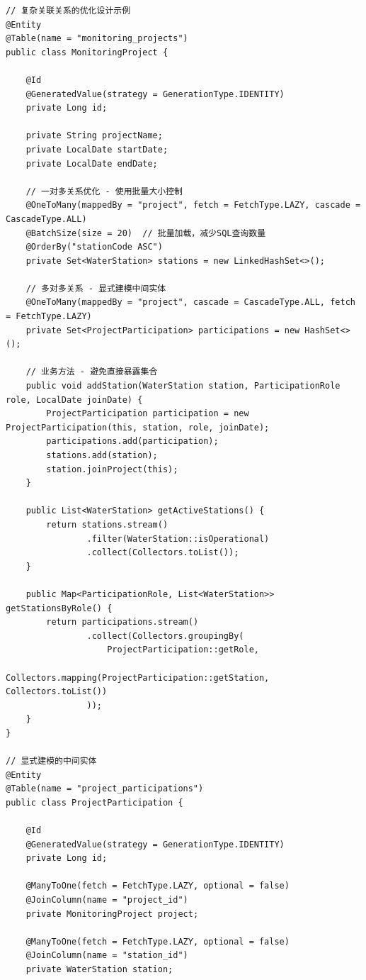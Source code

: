 \begin{lstlisting}[style=java]
// 复杂关联关系的优化设计示例
@Entity
@Table(name = "monitoring_projects")
public class MonitoringProject {
    
    @Id
    @GeneratedValue(strategy = GenerationType.IDENTITY)
    private Long id;
    
    private String projectName;
    private LocalDate startDate;
    private LocalDate endDate;
    
    // 一对多关系优化 - 使用批量大小控制
    @OneToMany(mappedBy = "project", fetch = FetchType.LAZY, cascade = CascadeType.ALL)
    @BatchSize(size = 20)  // 批量加载，减少SQL查询数量
    @OrderBy("stationCode ASC")
    private Set<WaterStation> stations = new LinkedHashSet<>();
    
    // 多对多关系 - 显式建模中间实体
    @OneToMany(mappedBy = "project", cascade = CascadeType.ALL, fetch = FetchType.LAZY)
    private Set<ProjectParticipation> participations = new HashSet<>();
    
    // 业务方法 - 避免直接暴露集合
    public void addStation(WaterStation station, ParticipationRole role, LocalDate joinDate) {
        ProjectParticipation participation = new ProjectParticipation(this, station, role, joinDate);
        participations.add(participation);
        stations.add(station);
        station.joinProject(this);
    }
    
    public List<WaterStation> getActiveStations() {
        return stations.stream()
                .filter(WaterStation::isOperational)
                .collect(Collectors.toList());
    }
    
    public Map<ParticipationRole, List<WaterStation>> getStationsByRole() {
        return participations.stream()
                .collect(Collectors.groupingBy(
                    ProjectParticipation::getRole,
                    Collectors.mapping(ProjectParticipation::getStation, Collectors.toList())
                ));
    }
}

// 显式建模的中间实体
@Entity
@Table(name = "project_participations")
public class ProjectParticipation {
    
    @Id
    @GeneratedValue(strategy = GenerationType.IDENTITY)
    private Long id;
    
    @ManyToOne(fetch = FetchType.LAZY, optional = false)
    @JoinColumn(name = "project_id")
    private MonitoringProject project;
    
    @ManyToOne(fetch = FetchType.LAZY, optional = false)  
    @JoinColumn(name = "station_id")
    private WaterStation station;
    

\end{lstlisting}
